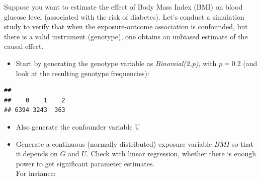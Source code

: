 \documentclass[
]{book}
\newenvironment{Shaded}{\begin{snugshade}}{\end{snugshade}}
\newcommand{\AttributeTok}[1]{\textcolor[rgb]{0.13,0.29,0.53}{#1}}
\newcommand{\DecValTok}[1]{\textcolor[rgb]{0.00,0.00,0.81}{#1}}
\newcommand{\FloatTok}[1]{\textcolor[rgb]{0.00,0.00,0.81}{#1}}
\newcommand{\FunctionTok}[1]{\textcolor[rgb]{0.13,0.29,0.53}{\textbf{#1}}}
\newcommand{\NormalTok}[1]{#1}
\newcommand{\OtherTok}[1]{\textcolor[rgb]{0.56,0.35,0.01}{#1}}
\newcommand{\SpecialCharTok}[1]{\textcolor[rgb]{0.81,0.36,0.00}{\textbf{#1}}}
\providecommand{\tightlist}{%
  \setlength{\itemsep}{0pt}\setlength{\parskip}{0pt}}
\theoremstyle{definition}
\theoremstyle{definition}
\theoremstyle{definition}
\theoremstyle{definition}
\theoremstyle{remark}
\begin{document}
Suppose you want to estimate the effect of Body Mass Index (BMI) on blood glucose level (associated with the risk of diabetes). Let's conduct a simulation study to verify that when the exposure-outcome association is confounded, but there is a valid instrument (genotype), one obtains an unbiased estimate of the causal effect.

\begin{itemize}
\tightlist
\item
  Start by generating the genotype variable as \emph{Binomial(2,p)}, with \(p=0.2\) (and look at the resulting genotype frequencies):
\end{itemize}

\begin{Shaded}
\end{Shaded}

\begin{verbatim}
## 
##    0    1    2 
## 6394 3243  363
\end{verbatim}

\begin{itemize}
\tightlist
\item
  Also generate the confounder variable U
\end{itemize}

\begin{Shaded}
\end{Shaded}

\begin{itemize}
\tightlist
\item
  Generate a continuous (normally distributed) exposure variable \(BMI\) so that it depends on \(G\) and \(U\). Check with linear regression, whether there is enough power to get significant parameter estimates.\\
  For instance:
\end{itemize}
\end{document}
